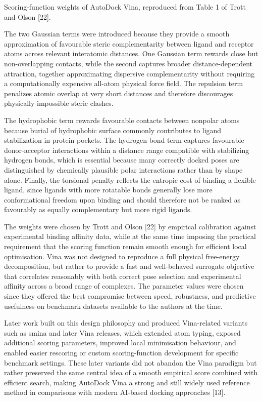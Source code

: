 Scoring-function weights of AutoDock Vina, reproduced from Table 1 of Trott and Olson {[}22{]}.

The two Gaussian terms were introduced because they provide a smooth approximation of favourable steric complementarity between ligand and receptor atoms across relevant interatomic distances. One Gaussian term rewards close but non-overlapping contacts, while the second captures broader distance-dependent attraction, together approximating dispersive complementarity without requiring a computationally expensive all-atom physical force field. The repulsion term penalizes atomic overlap at very short distances and therefore discourages physically impossible steric clashes.

The hydrophobic term rewards favourable contacts between nonpolar atoms because burial of hydrophobic surface commonly contributes to ligand stabilization in protein pockets. The hydrogen-bond term captures favourable donor-acceptor interactions within a distance range compatible with stabilizing hydrogen bonds, which is essential because many correctly docked poses are distinguished by chemically plausible polar interactions rather than by shape alone. Finally, the torsional penalty reflects the entropic cost of binding a flexible ligand, since ligands with more rotatable bonds generally lose more conformational freedom upon binding and should therefore not be ranked as favourably as equally complementary but more rigid ligands.

The weights were chosen by Trott and Olson {[}22{]} by empirical calibration against experimental binding affinity data, while at the same time imposing the practical requirement that the scoring function remain smooth enough for efficient local optimisation. Vina was not designed to reproduce a full physical free-energy decomposition, but rather to provide a fast and well-behaved surrogate objective that correlates reasonably with both correct pose selection and experimental affinity across a broad range of complexes. The parameter values were chosen since they offered the best compromise between speed, robustness, and predictive usefulness on benchmark datasets available to the authors at the time.

Later work built on this design philosophy and produced Vina-related variants such as smina and later Vina releases, which extended atom typing, exposed additional scoring parameters, improved local minimisation behaviour, and enabled easier rescoring or custom scoring-function development for specific benchmark settings. These later variants did not abandon the Vina paradigm but rather preserved the same central idea of a smooth empirical score combined with efficient search, making AutoDock Vina a strong and still widely used reference method in comparisons with modern AI-based docking approaches {[}13{]}.

